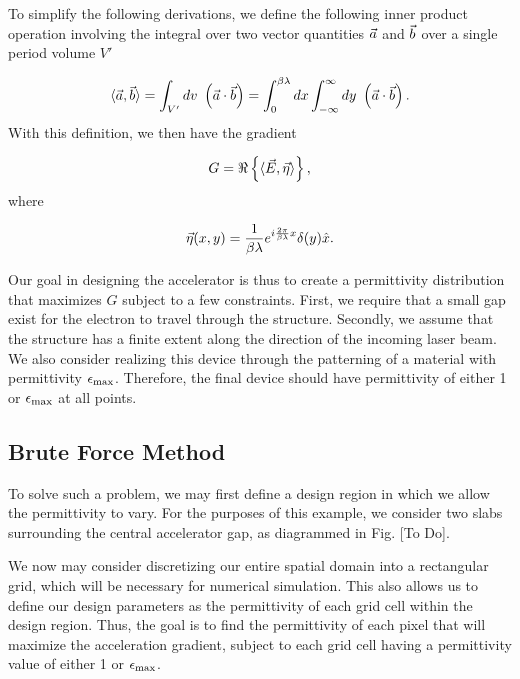To simplify the following derivations, we define the following inner product operation involving the integral over two vector quantities $\vec{a}$ and $\vec{b}$ over a single period volume $V'$

\begin{equation}
 \langle \vec{a} , \vec{b} \rangle  = \int_{V'} dv \  \left(\vec{a} \cdot \vec{b} \right) = \int_0^{\beta\lambda}dx\int_{-\infty}^\infty dy \   \left(\vec{a}\cdot\vec{b}\right).
\end{equation} 
With this definition, we then have the gradient

\begin{equation}
G =  \Re \left\{  \langle \vec{E} , \vec{\eta} \rangle  \right\} ,
\label{eq:G}
\end{equation}
where

\begin{equation}
\vec{\eta}(x,y) = \frac{1}{\beta\lambda}e^{i\frac{2\pi}{\beta\lambda}x}\delta(y)\hat{x}.
\end{equation}

Our goal in designing the accelerator is thus to create a permittivity distribution that maximizes $G$ subject to a few constraints.
First, we require that a small gap exist for the electron to travel through the structure.
Secondly, we assume that the structure has a finite extent along the direction of the incoming laser beam.
We also consider realizing this device through the patterning of a material with permittivity $\epsilon_\textrm{max}$.  
Therefore, the final device should have permittivity of either 1 or $\epsilon_\textrm{max}$ at all points.

\subsection{Brute Force Method}

To solve such a problem, we may first define a design region in which we allow the permittivity to vary.
For the purposes of this example, we consider two slabs surrounding the central accelerator gap, as diagrammed in Fig. [To Do].

We now may consider discretizing our entire spatial domain into a rectangular grid, which will be necessary for numerical simulation.
This also allows us to define our design parameters as the permittivity of each grid cell within the design region.  Thus, the goal is to find the permittivity of each pixel that will maximize the acceleration gradient, subject to each grid cell having a permittivity value of either 1 or $\epsilon_\textrm{max}$.

